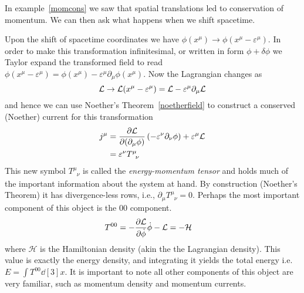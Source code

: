 In example~\ref{momcons} we saw that spatial translations led to conservation of
momentum. We can then ask what happens when we shift spacetime.
\begin{example}\label{ex:enmomtensor}
    Upon the shift of spacetime coordinates we have
    \(\phi(x^\mu)\to\phi(x^\mu - \varepsilon^\mu)\). In order to make this
    transformation infinitesimal, or written in form \(\phi + \delta\phi\) we
    Taylor expand the transformed field to read \(\phi(x^\mu - \varepsilon^\mu) = \phi(x^\mu) - \varepsilon^\mu\partial_\mu\phi(x^\mu)\).
    Now the Lagrangian changes as
    \begin{equation}
        \mathcal{L}\to \mathcal{L}(x^\mu - \varepsilon^\mu) = \mathcal{L} - \varepsilon^\mu\partial_\mu\mathcal{L}
    \end{equation}
    and hence we can use Noether's Theorem~\ref{noetherfield} to construct a
    conserved (Noether) current for this transformation
    \begin{align}\label{eq:enmomtensor}
        j^\mu & = \pdv{\mathcal{L}}{(\partial_\mu\phi)}\left(-\varepsilon^\nu\partial_\nu\phi\right) + \varepsilon^\mu\mathcal{L} \\
              & = \varepsilon^\nu T^\mu_{\phantom{\mu}\nu}
    \end{align}
    This new symbol \(T^\mu_{\phantom{\mu}\nu}\) is called the
    \textit{energy-momentum tensor} and holds much of the important information
    about the system at hand. By construction (Noether's Theorem) it has
    divergence-less rows, i.e., \(\partial_\mu T^\mu_{\phantom{\mu}\nu} = 0\).
    Perhaps the most important component of this object is the \(00\) component.
    \begin{align}
        T^{00} & = -\pdv{\mathcal{L}}{\dot{\phi}}\dot{\phi} - \mathcal{L} = -\mathcal{H}
    \end{align}
    where \(\mathcal{H}\) is the Hamiltonian density (akin the the Lagrangian
    density). This value is exactly the energy density, and integrating it
    yields the total energy i.e. \(E = \int T^{00}\dd[3]{x}\). It is important
    to note all other components of this object are very familiar, such as
    momentum density and momentum currents.
\end{example}